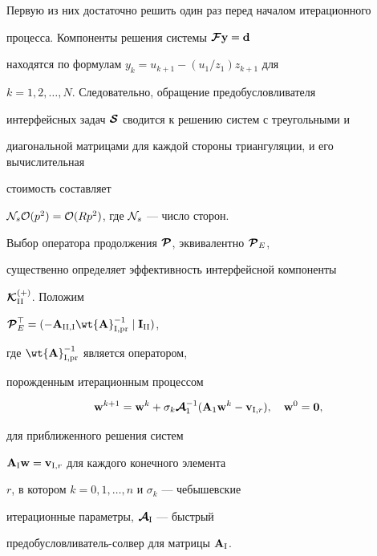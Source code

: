 Первую из них достаточно решить один раз перед началом итерационного


процесса. Компоненты решения системы $\boldsymbol {\cal F}{\bold y}={\bold d}$ 


находятся по формулам $y_k=u_{k+1}-(u_1/z_1) z_{k+1}$ для 


$k=1,2,\dotsc, N$. Следовательно, обращение предобусловливателя 


интерфейсных задач $\boldsymbol {\cal S}$ сводится к решению систем с треугольными и


диагональной матрицами для каждой стороны триангуляции, и его вычислительная 


стоимость составляет


${\cal N}_s{\cal O}(p^2)={\cal {O}}(Rp^2)$, где ${\cal N}_s$ --- число сторон.





Выбор оператора продолжения $\boldsymbol {\cal P}$, эквивалентно $\boldsymbol {\cal P}_E$, 


существенно определяет эффективность интерфейсной компоненты


$\boldsymbol {\cal K}_{{\mathrm{II}}}^{(+)}$. Положим 


$\bi{\cal P}^\top_E=(-{\bold A}_{\rii,\ri}\wt{\bold A}


_{\ri,\mathrm{pr}}^{-1}\mid {\bold I}_{\rii})$,


где $\wt{\bold A} _{\ri,\mathrm{pr}}^{-1}$ является оператором, 


порожденным итерационным процессом


\begin{equation}\label{inexact1}


{\bold w}^{k+1}={\bold w}^{k}+ \sigma_k {\bc A}_1^{-1}


({\bold A}_1{\bold w}^{k}-


{\bold v}_{\ri,r}), \quad {\bold w}^0={\bold 0},


\end{equation}


для приближенного решения систем 


${\bold A}_{\mathrm{I}}{\bold w}={\bold v}_{{\mathrm{I}},r}$ для каждого конечного элемента


$r$, в котором $k=0,1,\dotsc,n$ и $\sigma_k $ --- чебышевские 


итерационные параметры, ${\boldsymbol {\cal {A}}}_{\mathrm{I}}$ --- быстрый


предобусловлива\-тель-сол\-вер для матрицы ${\bold A}_{\mathrm{I}}$.








